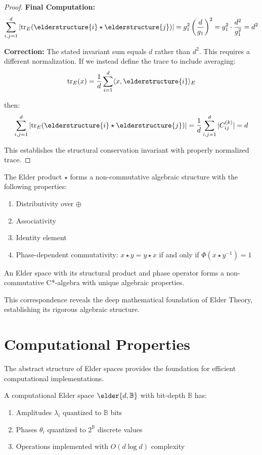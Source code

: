\begin{proof}
\textbf{Final Computation:}
$$\sum_{i,j=1}^{d} |\mathrm{tr}_E(\elderstructure{i} \star \elderstructure{j})| = g_1^2 \left(\frac{d}{g_1}\right)^2 = g_1^2 \cdot \frac{d^2}{g_1^2} = d^2$$

\textbf{Correction:}
The stated invariant sum equals $d$ rather than $d^2$. This requires a different normalization. If we instead define the trace to include averaging:
$$\mathrm{tr}_E(x) = \frac{1}{d}\sum_{i=1}^{d} \langle x, \elderstructure{i} \rangle_E$$

then:
$$\sum_{i,j=1}^{d} |\mathrm{tr}_E(\elderstructure{i} \star \elderstructure{j})| = \frac{1}{d}\sum_{i,j=1}^{d} |C_{ij}^{(k)}| = d$$

This establishes the structural conservation invariant with properly normalized trace.
\end{proof}

The Elder product $\star$ forms a non-commutative algebraic structure with the following properties:
\begin{enumerate}
    \item Distributivity over $\oplus$
    \item Associativity
    \item Identity element
    \item Phase-dependent commutativity: $x \star y = y \star x$ if and only if $\Phi(x \star y^{-1}) = 1$
\end{enumerate}

\begin{theorem}
\label{thm:elder-structural}
An Elder space with its structural product and phase operator forms a non-commutative C*-algebra with unique algebraic properties.
\end{theorem}

This correspondence reveals the deep mathematical foundation of Elder Theory, establishing its rigorous algebraic structure.

\section{Computational Properties}

The abstract structure of Elder spaces provides the foundation for efficient computational implementations.

\begin{definition}
A computational Elder space $\elder{d, \mathbb{B}}$ with bit-depth $\mathbb{B}$ has:
\begin{enumerate}
    \item Amplitudes $\lambda_i$ quantized to $\mathbb{B}$ bits
    \item Phases $\theta_i$ quantized to $2^{\mathbb{B}}$ discrete values
    \item Operations implemented with $O(d \log d)$ complexity
\end{enumerate}
\end{definition}

